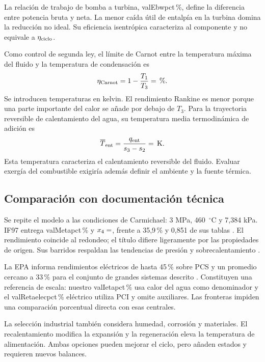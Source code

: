 \documentclass[conference,a4paper,11pt]{IEEEtran}
\newcommand{\V}[1]{\csname val#1\endcsname}
\begin{document}
La relación de trabajo de bomba a turbina, \V{Ebwpct}\,\%, define la diferencia entre potencia bruta y neta. La menor caída útil de entalpía en la turbina domina la reducción no ideal. Su eficiencia isentrópica caracteriza al componente y no equivale a $\eta_{\rm ciclo}$.

Como control de segunda ley, el límite de Carnot entre la temperatura máxima del fluido y la temperatura de condensación es
\begin{equation}
\eta_{\rm Carnot}=1-\frac{T_1}{T_3}=\V{Ecarnot}\,\%.
\label{eq:carnot}
\end{equation}
Se introducen temperaturas en kelvin. El rendimiento Rankine es menor porque una parte importante del calor se añade por debajo de $T_3$. Para la trayectoria reversible de calentamiento del agua, su temperatura media termodinámica de adición es
\begin{equation}
\overline T_{\rm ent}=\frac{q_{\rm ent}}{s_3-s_2}
=\V{ETmean}\,\mathrm K.
\label{eq:tmedia}
\end{equation}
Esta temperatura caracteriza el calentamiento reversible del fluido. Evaluar exergía del combustible exigiría además definir el ambiente y la fuente térmica.

\subsection{Comparación con documentación técnica}
Se repite el modelo a las condiciones de Carmichael: 3 MPa, 460~$^\circ$C y 7,384 kPa. IF97 entrega \V{Metapct}\,\% y $x_4=\V{Mx}$, frente a 35,9\,\% y 0,851 de sus tablas \cite{mit_rankine}. El rendimiento coincide al redondeo; el título difiere ligeramente por las propiedades de origen. Sus barridos respaldan las tendencias de presión y sobrecalentamiento \cite{mit_parametros}.

La EPA informa rendimientos eléctricos de hasta 45\,\% sobre PCS y un promedio cercano a 33\,\% para el conjunto de grandes sistemas descrito \cite{epa}. Constituyen una referencia de escala: nuestro \V{Ietapct}\,\% usa calor del agua como denominador y el \V{Retaelecpct}\,\% eléctrico utiliza PCI y omite auxiliares. Las fronteras impiden una comparación porcentual directa con esas centrales.

La selección industrial también considera humedad, corrosión y materiales. El recalentamiento modifica la expansión y la regeneración eleva la temperatura de alimentación. Ambas opciones pueden mejorar el ciclo, pero añaden estados y requieren nuevos balances.
\end{document}
